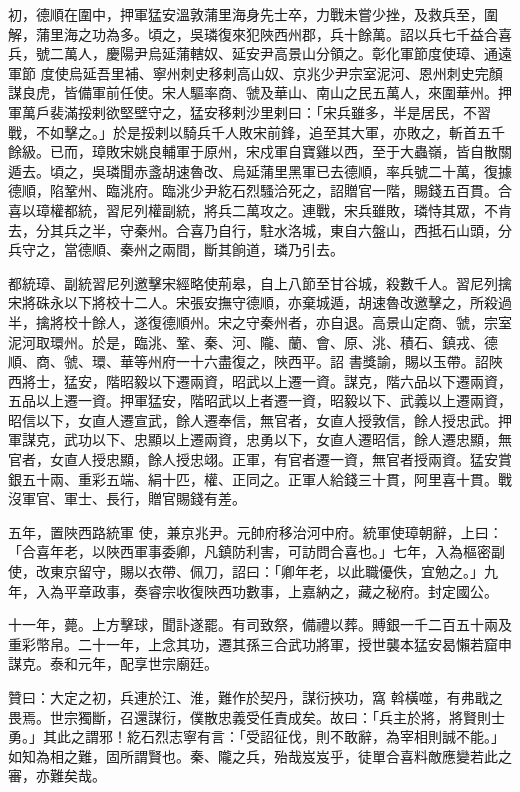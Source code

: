 \begin{pinyinscope}
 初，德順在圍中，押軍猛安溫敦蒲里海身先士卒，力戰未嘗少挫，及救兵至，圍解，蒲里海之功為多。頃之，吳璘復來犯陜西州郡，兵十餘萬。詔以兵七千益合喜兵，號二萬人，慶陽尹烏延蒲轄奴、延安尹高景山分領之。彰化軍節度使璋、通遠軍節
 度使烏延吾里補、寧州刺史移剌高山奴、京兆少尹宗室泥河、恩州刺史完顏謀良虎，皆備軍前任使。宋人驅率商、虢及華山、南山之民五萬人，來圍華州。押軍萬戶裴滿挼剌欲堅壁守之，猛安移剌沙里剌曰：「宋兵雖多，半是居民，不習戰，不如擊之。」於是挼剌以騎兵千人敗宋前鋒，追至其大軍，亦敗之，斬首五千餘級。已而，璋敗宋姚良輔軍于原州，宋戍軍自寶雞以西，至于大蟲嶺，皆自散關遁去。頃之，吳璘聞赤盞胡速魯改、烏延蒲里黑軍已去德順，率兵號二十萬，復據德順，陷鞏州、臨洮府。臨洮少尹紇石烈騷洽死之，詔贈官一階，賜錢五百貫。合
 喜以璋權都統，習尼列權副統，將兵二萬攻之。連戰，宋兵雖敗，璘恃其眾，不肯去，分其兵之半，守秦州。合喜乃自行，駐水洛城，東自六盤山，西抵石山頭，分兵守之，當德順、秦州之兩間，斷其餉道，璘乃引去。



 都統璋、副統習尼列邀擊宋經略使荊皋，自上八節至甘谷城，殺數千人。習尼列擒宋將硃永以下將校十二人。宋張安撫守德順，亦棄城遁，胡速魯改邀擊之，所殺過半，擒將校十餘人，遂復德順州。宋之守秦州者，亦自退。高景山定商、虢，宗室泥河取環州。於是，臨洮、鞏、秦、河、隴、蘭、會、原、洮、積石、鎮戎、德順、商、虢、環、華等州府一十六盡復之，陜西平。詔
 書獎諭，賜以玉帶。詔陜西將士，猛安，階昭毅以下遷兩資，昭武以上遷一資。謀克，階六品以下遷兩資，五品以上遷一資。押軍猛安，階昭武以上者遷一資，昭毅以下、武義以上遷兩資，昭信以下，女直人遷宣武，餘人遷奉信，無官者，女直人授敦信，餘人授忠武。押軍謀克，武功以下、忠顯以上遷兩資，忠勇以下，女直人遷昭信，餘人遷忠顯，無官者，女直人授忠顯，餘人授忠翊。正軍，有官者遷一資，無官者授兩資。猛安賞銀五十兩、重彩五端、絹十匹，權、正同之。正軍人給錢三十貫，阿里喜十貫。戰沒軍官、軍士、長行，贈官賜錢有差。



 五年，置陜西路統軍
 使，兼京兆尹。元帥府移治河中府。統軍使璋朝辭，上曰：「合喜年老，以陜西軍事委卿，凡鎮防利害，可訪問合喜也。」七年，入為樞密副使，改東京留守，賜以衣帶、佩刀，詔曰：「卿年老，以此職優佚，宜勉之。」九年，入為平章政事，奏睿宗收復陜西功數事，上嘉納之，藏之秘府。封定國公。



 十一年，薨。上方擊球，聞訃遂罷。有司致祭，備禮以葬。賻銀一千二百五十兩及重彩幣帛。二十一年，上念其功，遷其孫三合武功將軍，授世襲本猛安曷懶若窟申謀克。泰和元年，配享世宗廟廷。



 贊曰：大定之初，兵連於江、淮，難作於契丹，謀衍挾功，窩
 斡橫噬，有弗戢之畏焉。世宗獨斷，召還謀衍，僕散忠義受任責成矣。故曰：「兵主於將，將賢則士勇。」其此之謂邪！紇石烈志寧有言：「受詔征伐，則不敢辭，為宰相則誠不能。」如知為相之難，固所謂賢也。秦、隴之兵，殆哉岌岌乎，徒單合喜料敵應變若此之審，亦難矣哉。



\end{pinyinscope}